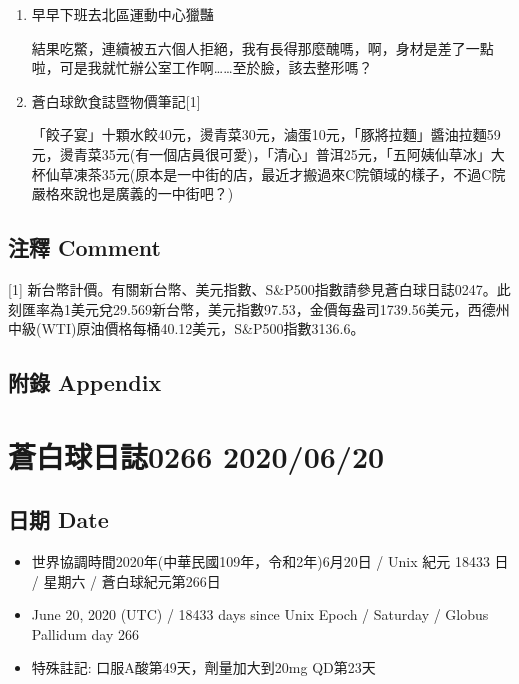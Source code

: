 \documentclass[a5paper, 11pt
]{book}
\providecommand{\tightlist}{%
  \setlength{\itemsep}{0pt}\setlength{\parskip}{0pt}}
\begin{document}
\begin{enumerate}
\def\labelenumi{\arabic{enumi}.}
\item
  早早下班去北區運動中心獵豔

  結果吃鱉，連續被五六個人拒絕，我有長得那麼醜嗎，啊，身材是差了一點啦，可是我就忙辦公室工作啊\ldots\ldots 至於臉，該去整形嗎？
\item
  蒼白球飲食誌暨物價筆記{[}1{]}

  「餃子宴」十顆水餃40元，燙青菜30元，滷蛋10元，「豚將拉麵」醬油拉麵59元，燙青菜35元(有一個店員很可愛)，「清心」普洱25元，「五阿姨仙草冰」大杯仙草凍茶35元(原本是一中街的店，最近才搬過來C院領域的樣子，不過C院嚴格來說也是廣義的一中街吧？)
\end{enumerate}

\hypertarget{ux6ce8ux91cb-comment-18}{%
\subsection{注釋 Comment}\label{ux6ce8ux91cb-comment-18}}

{[}1{]}
新台幣計價。有關新台幣、美元指數、S\&P500指數請參見蒼白球日誌0247。此刻匯率為1美元兌29.569新台幣，美元指數97.53，金價每盎司1739.56美元，西德州中級(WTI)原油價格每桶40.12美元，S\&P500指數3136.6。

\hypertarget{ux9644ux9304-appendix-18}{%
\subsection{附錄 Appendix}\label{ux9644ux9304-appendix-18}}

\hypertarget{ux84bcux767dux7403ux65e5ux8a8c0266-20200620}{%
\section{蒼白球日誌0266
2020/06/20}\label{ux84bcux767dux7403ux65e5ux8a8c0266-20200620}}

\hypertarget{ux65e5ux671f-date-19}{%
\subsection{日期 Date}\label{ux65e5ux671f-date-19}}

\begin{itemize}
\tightlist
\item
  世界協調時間2020年(中華民國109年，令和2年)6月20日 / Unix 紀元 18433 日
  / 星期六 / 蒼白球紀元第266日
\item
  June 20, 2020 (UTC) / 18433 days since Unix Epoch / Saturday / Globus
  Pallidum day 266
\item
  特殊註記: 口服A酸第49天，劑量加大到20mg QD第23天
\end{itemize}
\end{document}

